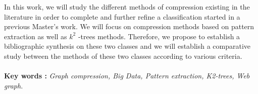  In this work, we will study the different methods of compression existing in the literature in order to complete and further refine a classification started in a previous Master's work. We will focus on compression methods based on pattern extraction as well as $ k^2$ -trees methods. Therefore, we propose to establish a bibliographic synthesis on these two classes and we will establish a comparative study between the methods of these two classes according to various criteria.
 \\\\ \textbf{Key words :} \textit{Graph compression, Big Data, Pattern extraction, K2-trees, Web graph.}

\newpage
 

